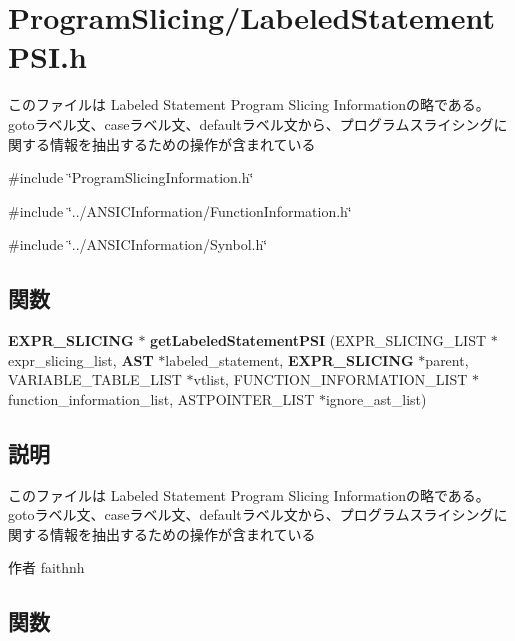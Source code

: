 \section{ProgramSlicing/LabeledStatementPSI.h}
\label{_labeled_statement_p_s_i_8h}


このファイルは Labeled Statement Program Slicing Informationの略である。 gotoラベル文、caseラベル文、defaultラベル文から、プログラムスライシングに関する情報を抽出するための操作が含まれている  


{\ttfamily \#include \char`\"{}ProgramSlicingInformation.h\char`\"{}}\par
{\ttfamily \#include \char`\"{}../ANSICInformation/FunctionInformation.h\char`\"{}}\par
{\ttfamily \#include \char`\"{}../ANSICInformation/Synbol.h\char`\"{}}\par
\subsection*{関数}
\begin{DoxyCompactItemize}
\item 
{\bf EXPR\_\-SLICING} $\ast$ {\bf getLabeledStatementPSI} (EXPR\_\-SLICING\_\-LIST $\ast$expr\_\-slicing\_\-list, {\bf AST} $\ast$labeled\_\-statement, {\bf EXPR\_\-SLICING} $\ast$parent, VARIABLE\_\-TABLE\_\-LIST $\ast$vtlist, FUNCTION\_\-INFORMATION\_\-LIST $\ast$function\_\-information\_\-list, ASTPOINTER\_\-LIST $\ast$ignore\_\-ast\_\-list)
\end{DoxyCompactItemize}


\subsection{説明}
このファイルは Labeled Statement Program Slicing Informationの略である。 gotoラベル文、caseラベル文、defaultラベル文から、プログラムスライシングに関する情報を抽出するための操作が含まれている \begin{DoxyAuthor}{作者}
faithnh 
\end{DoxyAuthor}


\subsection{関数}

